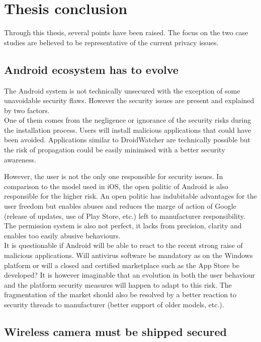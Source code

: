 \chapter{Thesis conclusion}
\label{chap:thesis-ccl}


Through this thesis, several points have been raised.
The focus on the two case studies are believed to be representative of the current privacy issues.

\section{Android ecosystem has to evolve}

The Android system is not technically unsecured with the exception of some unavoidable security flaws.
However the security issues are present and explained by two factors.\\

One of them comes from the negligence or ignorance of the security risks during the installation process.
Users will install malicious applications that could have been avoided.
Applications similar to DroidWatcher are technically possible but the risk of propagation could be easily minimised with a better security awareness.

However, the user is not the only one responsible for security issues.
In comparison to the model used in iOS, the open politic of Android is also responsible for the higher risk.
An open politic has indubitable advantages for the user freedom but enables abuses and reduces the marge of action of Google (release of updates, use of Play Store, etc.) left to manufacturer responsibility.
The permission system  is also not perfect, it lacks from precision, clarity and enables too easily abusive behaviours.\\

It is questionable if Android will be able to react to the recent strong raise of malicious applications.
Will antivirus software be mandatory as on the Windows platform or will a closed and certified marketplace such as the App Store be developed?
It is however imaginable that an evolution in both the user behaviour and the platform security measures will happen to adapt to this risk.
The fragmentation of the market should also be resolved by a better reaction to security threads to manufacturer (better support of older models, etc.).

\section{Wireless camera must be shipped secured}

